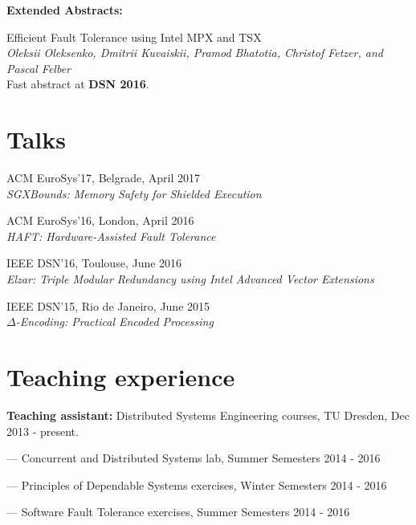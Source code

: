 \documentclass[letterpaper]{article}
\renewenvironment{itemize}{
  \begin{list}{}{
    \setlength{\leftmargin}{1.5em}
  }
}{
  \end{list}
}
\begin{document}
\clearpage

{\bf Extended Abstracts:}

\begin{itemize}

\item{Efficient Fault Tolerance using Intel MPX and TSX}\\
{\em Oleksii Oleksenko, {Dmitrii Kuvaiskii}, Pramod Bhatotia, Christof Fetzer, and Pascal Felber}\\
Fast abstract at {\bf DSN 2016}.


\end{itemize}


\section*{Talks}
\begin{itemize}
\item ACM EuroSys'17, Belgrade, April 2017\\
{\em  SGXBounds: Memory Safety for Shielded Execution}
\item ACM EuroSys'16, London, April 2016\\
	{\em  HAFT: Hardware-Assisted Fault Tolerance}
\item IEEE DSN'16, Toulouse, June 2016\\
	{\em  Elzar: Triple Modular Redundancy using Intel Advanced Vector Extensions}
\item IEEE DSN'15, Rio de Janeiro, June 2015\\
{\em  $\Delta$-Encoding: Practical Encoded Processing}
\end{itemize}


\section*{Teaching experience}

\begin{itemize}
\item {\bf Teaching assistant:} Distributed Systems Engineering courses, TU Dresden, Dec 2013 - present.
\begin{itemize}
	\item --- Concurrent and Distributed Systems lab, Summer Semesters 2014 - 2016 
	\item --- Principles of Dependable Systems exercises, Winter Semesters 2014 - 2016
	\item --- Software Fault Tolerance exercises, Summer Semesters 2014 - 2016
\end{itemize}
\end{itemize}
\end{document}
